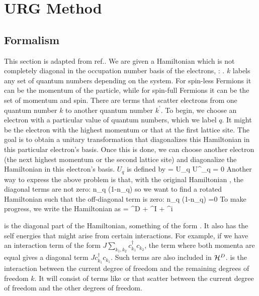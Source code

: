 \documentclass[14pt]{extarticle}
\numberwithin{equation}{section}
\begin{document}
\section{URG Method}\label{section2}
\subsection{Formalism}\label{urgform}
This section is adapted from ref.\cite{holography1}.
We are given a Hamiltonian \il{\ham} which is not completely diagonal in the occupation number basis of the electrons, : . \(k\) labels any set of quantum numbers depending on the system. For spin-less Fermions it can be the momentum of the particle, while for spin-full Fermions it can be the set of momentum and spin. There are terms that scatter electrons from one quantum number \(k\) to another quantum number \(k^\prime\).
\pb To begin, we choose an electron with a particular value of quantum numbers, which we label \(q\). It might be the electron with the highest momentum or that at the first lattice site. The goal is to obtain a unitary transformation  that diagonalizes this Hamiltonian in this particular electron's basis. Once this is done, we can choose another electron (the next highest momentum or the second lattice site) and diagonalize the Hamiltonian in this electron's basis.
\pb \(U_q\) is defined by
\beq
\tilde \ham = U_q \ham U^\dagger_q   = 0
\eeq
Another way to express the above problem is that, with the original Hamiltonian \il{\ham}, the diagonal terms are not zero:
\beq
n_q \ham(1-n_q) 
\eeq
so we want to find a rotated Hamiltonian  such that the off-diagonal term is zero:
\beq[solve]
n_q \tilde \ham(1-n_q) =0
\eeq
To make progress, we write the Hamiltonian \il{\ham} as
\beq[ham]
\ham = \ham^D + \ham^I + \ham^i 
\eeq
\begin{minipage}{310pt}
	 is the diagonal part of the Hamiltonian, something of the form .
It also has the self energies that might arise from certain interactions.
For example, if we have an interaction term of the form \(J \sum_{k_1,k_2}c^\dagger_{k_1}c_{k_2}\), the term where both momenta are equal gives a diagonal term \(J c^\dagger_{k_1}c_{k_1}\).
Such terms are also included in \(\mathcal{H}^D\).
\pb {} is the interaction between the current degree of freedom  and the remaining degrees of freedom \(k\).
It will consist of terms like  or  that scatter between the current degree of freedom and the other degrees of freedom.
\end{minipage}
\end{document}

